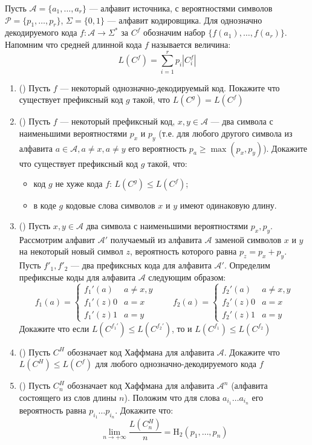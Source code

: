 \documentclass[homework, recordsfile={../records.lua}]{practice}
\newcommand{\addpt}[1]{(\textit{\addpoints{#1}})}
\begin{document}
\begin{exercise}
	Пусть $\mathcal{A} = \{a_1, \ldots, a_r\}$ --- алфавит источника, с вероятностями символов $\mathcal{P} = \{p_1, \ldots, p_r\}$, $\Sigma = \{0, 1\}$ --- алфавит кодировщика. Для однозначно декодируемого кода $f \colon \mathcal{A} \to \Sigma^*$ за $C^{f}$ обозначим набор $\{f(a_1), \ldots, f(a_r)\}$. Напомним что средней длинной кода $f$ называется величина:
	$$ L(C^f) = \sum_{i = 1}^{r} p_i |C_i^f| $$

\begin{enumerate}
	\item \addpt{1} Пусть $f$ --- некоторый однозначно-декодируемый код. Покажите что существует префиксный код $g$ такой, что $L(C^{g}) = L(C^{f})$
	\item \addpt{1} Пусть $f$ --- некоторый префиксный код, $x, y \in \mathcal{A}$ --- два символа с наименьшими вероятностями $p_x$ и $p_y$ (т.е. для любого другого символа из алфавита $a \in \mathcal{A}, a \neq x, a \neq y$ его вероятность  $p_a \geq \max(p_x, p_y)$).
Докажите что существует префиксный код $g$ такой, что:
	\begin{itemize}[compact]
	    \item код $g$ не хуже кода $f$: $L(C^{g}) \leq L(C^{f})$;
		\item в коде $g$ кодовые слова символов $x$ и $y$ имеют одинаковую длину.
	\end{itemize}
\item \addpt{1} Пусть  $x, y \in \mathcal{A}$ два символа с наименьшими вероятностями $p_x, p_y$. Рассмотрим алфавит $\mathcal{A}'$ получаемый из алфавита $\mathcal{A}$ заменой символов $x$ и $y$ на некоторый новый символ $z$, вероятность которого равна $p_z = p_x + p_y$. Пусть $f'_1, f'_2$ --- два префиксных кода для алфавита $\mathcal{A}'$. Определим префиксные коды для алфавита $\mathcal{A}$ следующим образом:
$$ f_1(a) = \begin{cases} f_1'(a) & a \neq x, y \\ f_1'(z)0 & a = x \\ f_1'(z)1 & a = y \end{cases} \qquad f_2(a) = \begin{cases} f_2'(a) & a \neq x, y \\ f_2'(z)0 & a = x \\ f_2'(z)1 & a = y \end{cases}$$
Докажите что если $L(C^{f_1'}) \leq L(C^{f_2'})$, то и $L(C^{f_1}) \leq L(C^{f_2})$
\item \addpt{2} Пусть $C^H$ обозначает код Хаффмана для алфавита $\mathcal{A}$. Докажите что $L(C^H) \leq L(C^f)$ для любого однозначно-декодируемого кода $f$
\item \addpt{3} Пусть $C^H_n$ обозначает код Хаффмана для алфавита  $\mathcal{A}^n$ (алфавита состоящего из слов длины $n$). Положим что для слова $a_{i_1}\ldots a_{i_n}$ его вероятность равна $p_{i_1}\ldots p_{i_n}$. Докажите что:
$$\lim_{n \to +\infty}\frac{L(C^{H}_n)}{n} =\mathrm{H}_2(p_1, \ldots, p_n)$$

\end{enumerate}
\end{exercise}
\end{document}
